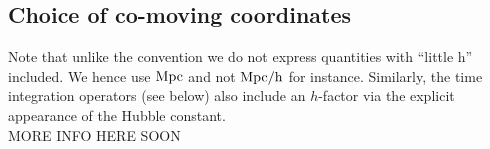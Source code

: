 \subsection{Choice of co-moving coordinates}
\label{ssec:ccordinates}

Note that unlike the \gadget convention we do not express quantities
with ``little h'' included. We hence use $\rm{Mpc}$ and not
$\rm{Mpc}/h$ for instance. Similarly, the time integration operators
(see below) also include an $h$-factor via the explicit appearance of
the Hubble constant.\\


MORE INFO HERE SOON
